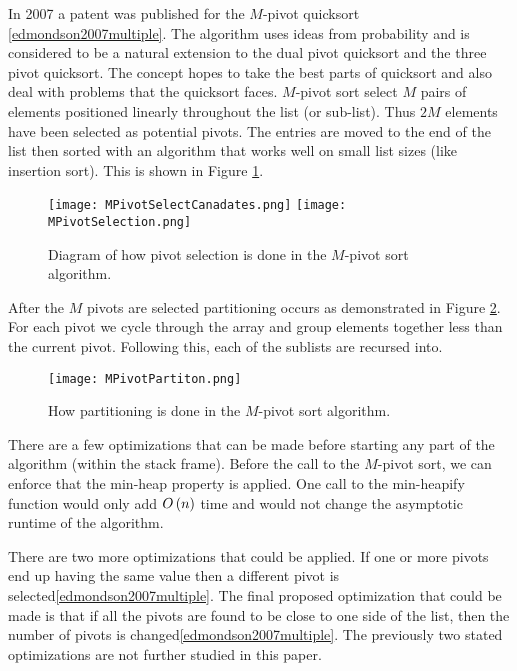 		In 2007 a patent was published for the $M$-pivot quicksort \ref{edmondson2007multiple}. The algorithm uses ideas from probability and is considered to be a natural extension to the dual pivot quicksort and the three pivot quicksort. The concept hopes to take the best parts of quicksort and also deal with problems that the quicksort faces. $M$-pivot sort select $M$ pairs of elements positioned linearly throughout the list (or sub-list).  Thus $2M$ elements have been selected as potential pivots. The entries are moved to the end of the list then sorted with an algorithm that works well on small list sizes (like insertion sort). This is shown in Figure \ref{fig:MPivotSelecton}.
		\begin{figure}[ht!]
			\begin{center}
				\texttt{[image: MPivotSelectCanadates.png]}
				\texttt{[image: MPivotSelection.png]}
				\caption{Diagram of how pivot selection is done in the $M$-pivot sort algorithm.}
				\label{fig:MPivotSelecton}
			\end{center}
		\end{figure}
		After the $M$ pivots are selected partitioning occurs as demonstrated in Figure \ref{fig:MPivotPartition}. For each pivot we cycle through the array and group elements together less than the current pivot. Following this, each of the sublists are recursed into.
		\begin{figure}[ht!]
			\begin{center}
				\texttt{[image: MPivotPartiton.png]}
				\caption{How partitioning is done in the $M$-pivot sort algorithm.}
				\label{fig:MPivotPartition}
			\end{center}
		\end{figure}
		There are a few optimizations that can be made before starting any part of the algorithm (within the stack frame)\cite{edmondson2007multiple}. Before the call to the $M$-pivot sort, we can enforce that the min-heap property is applied. One call to the min-heapify function would only add $O\left(n\right)$ time and would not change the asymptotic runtime of the algorithm.
		
		There are two more optimizations that could be applied. If one or more pivots end up having the same value then a different pivot is selected\ref{edmondson2007multiple}. The final proposed optimization that could be made is that if all the pivots are found to be close to one side of the list, then the number of pivots is changed\ref{edmondson2007multiple}. The previously two stated optimizations are not further studied in this paper.

